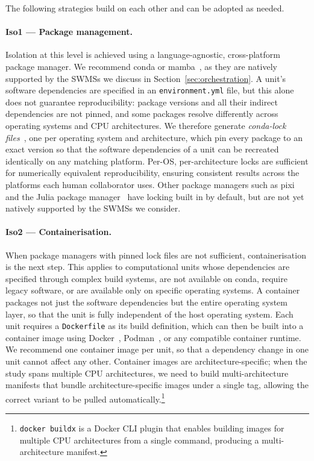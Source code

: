 \documentclass{eceasst}
\begin{document}
The following strategies build on each other and can be adopted as needed.

\paragraph{Iso1 --- Package management.}
Isolation at this level is achieved using a language-agnostic, cross-platform
package manager. We recommend conda or mamba~\cite{conda,mamba},
as they are natively supported by the SWMSs we discuss in
Section~\ref{sec:orchestration}. A unit's software dependencies are specified
in an \texttt{environment.yml} file, but this alone does not guarantee
reproducibility: package versions and all their indirect dependencies are not
pinned, and some packages resolve differently across operating systems and CPU
architectures. We therefore generate \emph{conda-lock files}~\cite{condalock}, one per operating
system and architecture, which pin every package to an exact version so that
the software dependencies of a unit can be recreated identically on any
matching platform. Per-OS, per-architecture locks are sufficient for numerically equivalent
reproducibility, ensuring consistent results across the platforms each
human collaborator uses. Other package managers such as pixi~\cite{pixi} and the Julia
package manager~\cite{juliapkg} have locking built in by default, but are not
yet natively supported by the SWMSs we consider.

\paragraph{Iso2 --- Containerisation.}
When package managers with pinned lock files are not sufficient, containerisation is the next step.
This applies to computational units whose dependencies are specified through complex build systems, are not available on conda, require legacy software, or are available only on specific operating systems. 
A container packages not just the software dependencies but the entire
operating system layer, so that the unit is fully independent of the host
operating system. Each unit requires a \texttt{Dockerfile} as its build definition, which can then be built into a container image using Docker~\cite{merkel2014docker},
Podman~\cite{heon2018podman}, or any compatible container runtime. We recommend one container image per unit, so that a dependency change in one
unit cannot affect any other. Container images are architecture-specific; when the study spans multiple CPU
architectures, we need to build multi-architecture manifests that bundle
architecture-specific images under a single tag, allowing the correct variant
to be pulled automatically.\footnote{\texttt{docker buildx} is a Docker CLI
plugin that enables building images for multiple CPU architectures from a
single command, producing a multi-architecture manifest.}
\end{document}
